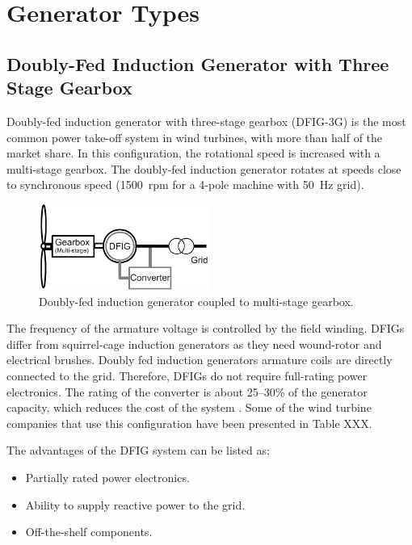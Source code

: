 \documentclass[a4paper, 11pt]{article} %
\begin{document}
\section{Generator Types}

\subsection{Doubly-Fed Induction Generator with Three Stage Gearbox}

Doubly-fed induction generator with three-stage gearbox (DFIG-3G) is the most common power take-off system in wind turbines, with more than half of the market share. In this configuration, the rotational speed is increased with a multi-stage gearbox. The doubly-fed induction generator rotates at speeds close to synchronous speed (1500~rpm for a 4-pole machine with 50~Hz grid).

  \begin{figure}
    \centering
    \includegraphics[width=0.5\textwidth]{DFIG_3G}
    \caption{Doubly-fed induction generator coupled to multi-stage gearbox.} 
    \label{dfig_3g}
  \end{figure}

The frequency of the armature voltage is controlled by the field winding. DFIGs differ from squirrel-cage induction generators as they need wound-rotor and electrical brushes. Doubly fed induction generators armature coils are directly connected to the grid. Therefore, DFIGs do not require full-rating power electronics. The rating of the converter is about 25--30\% of the generator capacity, which reduces the cost of the system \cite{Li2008a} . Some of the wind turbine companies that use this configuration have been presented in Table XXX.

The advantages of the DFIG system can be listed as;

\begin{itemize}
	\item Partially rated power electronics.
	\item Ability to supply reactive power to the grid.
	\item Off-the-shelf components.
\end{itemize}
\end{document}
